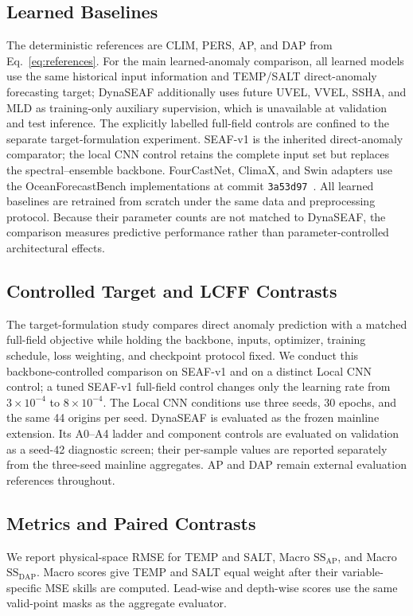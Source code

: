 \documentclass[conference]{IEEEtran}
\begin{document}
\subsection{Learned Baselines}
The deterministic references are CLIM, PERS, AP, and DAP from Eq.~\eqref{eq:references}. For the main learned-anomaly comparison, all learned models use the same historical input information and TEMP/SALT direct-anomaly forecasting target; DynaSEAF additionally uses future UVEL, VVEL, SSHA, and MLD as training-only auxiliary supervision, which is unavailable at validation and test inference. The explicitly labelled full-field controls are confined to the separate target-formulation experiment. SEAF-v1 is the inherited direct-anomaly comparator; the local CNN control retains the complete input set but replaces the spectral--ensemble backbone. FourCastNet, ClimaX, and Swin adapters use the OceanForecastBench implementations at commit \texttt{3a53d97}~\cite{han2026oceanforecastbench,oceanforecastbenchCode2025}. All learned baselines are retrained from scratch under the same data and preprocessing protocol. Because their parameter counts are not matched to DynaSEAF, the comparison measures predictive performance rather than parameter-controlled architectural effects.

\subsection{Controlled Target and LCFF Contrasts}
The target-formulation study compares direct anomaly prediction with a matched full-field objective while holding the backbone, inputs, optimizer, training schedule, loss weighting, and checkpoint protocol fixed. We conduct this backbone-controlled comparison on SEAF-v1 and on a distinct Local CNN control; a tuned SEAF-v1 full-field control changes only the learning rate from $3\times10^{-4}$ to $8\times10^{-4}$. The Local CNN conditions use three seeds, 30 epochs, and the same 44 origins per seed. DynaSEAF is evaluated as the frozen mainline extension. Its A0--A4 ladder and component controls are evaluated on validation as a seed-42 diagnostic screen; their per-sample values are reported separately from the three-seed mainline aggregates. AP and DAP remain external evaluation references throughout.

\subsection{Metrics and Paired Contrasts}
We report physical-space RMSE for TEMP and SALT, Macro $\mathrm{SS}_{\mathrm{AP}}$, and Macro $\mathrm{SS}_{\mathrm{DAP}}$. Macro scores give TEMP and SALT equal weight after their variable-specific MSE skills are computed. Lead-wise and depth-wise scores use the same valid-point masks as the aggregate evaluator.
\end{document}
